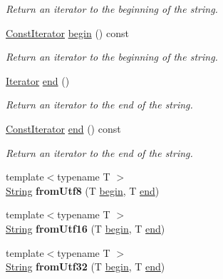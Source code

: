\begin{DoxyCompactItemize}
\begin{DoxyCompactList}\small\item\em Return an iterator to the beginning of the string. \end{DoxyCompactList}\item 
\hyperlink{classsf_1_1String_a8e18efc2e8464f6eb82818902d527efa}{Const\+Iterator} \hyperlink{classsf_1_1String_a0e4755d6b4d51de7c3dc2e984b79f95d}{begin} () const
\begin{DoxyCompactList}\small\item\em Return an iterator to the beginning of the string. \end{DoxyCompactList}\item 
\hyperlink{classsf_1_1String_ac90f2b7b28f703020f8d027e98806235}{Iterator} \hyperlink{classsf_1_1String_ac823012f39cb6f61100418876e99d53b}{end} ()
\begin{DoxyCompactList}\small\item\em Return an iterator to the end of the string. \end{DoxyCompactList}\item 
\hyperlink{classsf_1_1String_a8e18efc2e8464f6eb82818902d527efa}{Const\+Iterator} \hyperlink{classsf_1_1String_af1ab4c82ff2bdfb6903b4b1bb78a8e5c}{end} () const
\begin{DoxyCompactList}\small\item\em Return an iterator to the end of the string. \end{DoxyCompactList}\item 
\mbox{\label{classsf_1_1String_a0b93eacbb10ea41f25669f2ace0148c2}} 
{\footnotesize template$<$typename T $>$ }\\\hyperlink{classsf_1_1String}{String} {\bfseries from\+Utf8} (T \hyperlink{classsf_1_1String_a8ec30ddc08e3a6bd11c99aed782f6dfe}{begin}, T \hyperlink{classsf_1_1String_ac823012f39cb6f61100418876e99d53b}{end})
\item 
\mbox{\label{classsf_1_1String_acf4be994a8f801ef399ef934e892c891}} 
{\footnotesize template$<$typename T $>$ }\\\hyperlink{classsf_1_1String}{String} {\bfseries from\+Utf16} (T \hyperlink{classsf_1_1String_a8ec30ddc08e3a6bd11c99aed782f6dfe}{begin}, T \hyperlink{classsf_1_1String_ac823012f39cb6f61100418876e99d53b}{end})
\item 
\mbox{\label{classsf_1_1String_aecbcc789c2505f1583c586516be82a94}} 
{\footnotesize template$<$typename T $>$ }\\\hyperlink{classsf_1_1String}{String} {\bfseries from\+Utf32} (T \hyperlink{classsf_1_1String_a8ec30ddc08e3a6bd11c99aed782f6dfe}{begin}, T \hyperlink{classsf_1_1String_ac823012f39cb6f61100418876e99d53b}{end})
\end{DoxyCompactItemize}
